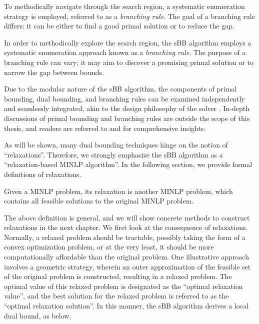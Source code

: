  To methodically navigate through the search region, a systematic enumeration strategy is employed, referred to as a \emph{branching rule}.  The goal of a branching rule differs: it can be either to find a good primal solution or to reduce the gap. 
 


In order to methodically explore the search region, the sBB algorithm employs a systematic enumeration approach known as a \emph{branching rule}. The purpose of a branching rule can vary; it may aim to discover a promising primal solution or to narrow the gap between bounds.

Due to the modular nature of the sBB algorithm, the components of primal bounding, dual bounding, and branching rules can be examined independently and seamlessly integrated, akin to the design philosophy of the \scip solver \cite{bestuzheva2023global}. In-depth discussions of primal bounding and branching rules are outside the scope of this thesis, and readers are referred to \cite{belotti2009branching} and  \cite{berthold2015heuristic} for comprehensive insights.

As will be shown, many dual bounding techniques hinge on the notion of ``relaxations''. Therefore, we strongly emphasize the sBB algorithm as a ``relaxation-based MINLP algorithm''. In the following section, we provide formal definitions of relaxations.

\begin{definition}
  Given a MINLP problem, its relaxation is another MINLP problem, which contains all feasible solutions to the original MINLP problem.
\end{definition}

The above definition is general, and we will show concrete methods to construct relaxations in the next chapter. We first look at the consequence of relaxations.
Normally, a relaxed problem should be tractable, possibly taking the form of a convex optimization problem, or at the very least, it should be more computationally affordable than the original problem. One illustrative approach involves a geometric strategy, wherein an outer approximation of the feasible set of the original problem is constructed, resulting in a relaxed problem. The optimal value of this relaxed problem is designated as the ``optimal relaxation value'', and the best solution for the relaxed problem is referred to as the ``optimal relaxation solution''. In this manner, the sBB algorithm derives a local dual bound, as  below.

